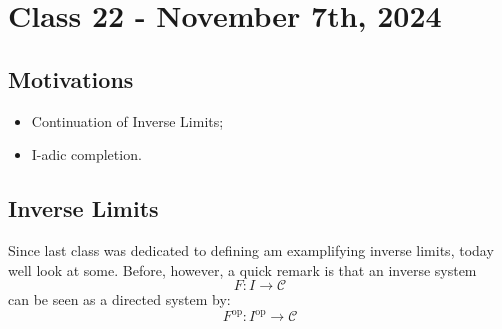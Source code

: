 \documentclass[../category_theory.tex]{subfiles}
\begin{document}
\section{Class 22 - November 7th, 2024}
\subsection{Motivations}
\begin{itemize}
	\item Continuation of Inverse Limits;
	\item I-adic completion.
\end{itemize}
\subsection{Inverse Limits}
Since last class was dedicated to defining am examplifying inverse limits, today well look at some. Before, however, a quick remark is that an inverse system
\[
	F:I\rightarrow \mathcal{C}
\]
can be seen as a directed system by:
\[
	F^{\mathrm{op}}:I^{\mathrm{op}}\rightarrow \mathcal{C}
\]
\end{document}
